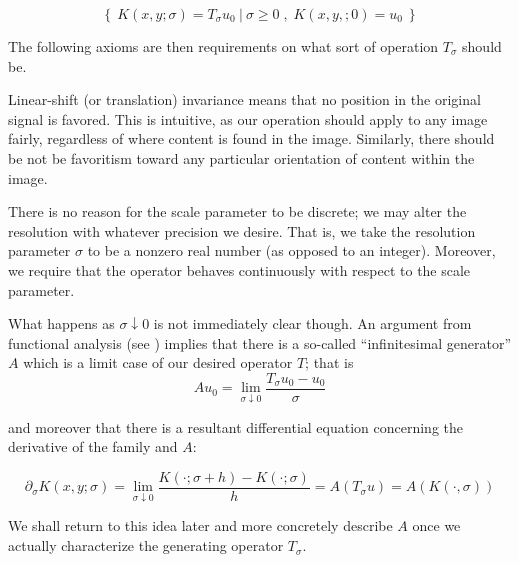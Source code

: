 	\[
		\left\{\ K(x,y;\sigma) = T_\sigma u_0
		\ \lvert \ 
		\sigma \ge 0
		\; ,\; K(x,y,;0) = u_0
		\ \right\} 
	\]
    
	The following axioms are then requirements on what sort
	of operation $T_\sigma$ should be.
		
    \begin{axiom}
    	\label{axiom:linear-shift-and-rotation}
    Linear-shift (or translation) invariance means that no position in the original signal is favored.  This is intuitive, as our operation should apply to any image fairly, regardless of where content is found in the image. Similarly, there should be not be favoritism toward any particular orientation of content within the image.
\end{axiom}
    
    \begin{axiom}
    	\label{axiom:continuity} There is no reason for the scale parameter to be discrete; we may alter the resolution with whatever
    precision we desire. That is, we take the resolution
    parameter $\sigma$ to be a nonzero real number
    (as opposed to an integer). Moreover, we require that the operator behaves continuously with respect to the scale parameter.
        \end{axiom}
    What happens as $\sigma \downarrow 0$ is not immediately clear though. 	An argument from functional analysis (see \cite{hille1957functional}) implies that there is a so-called ``infinitesimal generator'' $A$
	which is a limit case of our desired operator $T$; that is
	\begin{equation} \label{eq:infinitesimal-generator}
	A u_0 = \lim_{\sigma \downarrow 0} \frac{T_\sigma u_0 - u_0}{\sigma}
	\end{equation}
	 
	 and moreover that there is a resultant differential equation
	 concerning the derivative of the family and $A$:
	 
	 \begin{equation}
	 \partial_{\sigma} K(x,y;\sigma)
	 = \lim_{\sigma \downarrow 0}
	 \frac{K(\cdot;\sigma+h) - K(\cdot; \sigma)}{h}
	 = A(T_\sigma u) = A(K(\cdot,\sigma))
	 \end{equation}
	 
	 We shall return to this idea later and more concretely describe $A$ once we actually characterize the generating 
	 operator $T_\sigma$.
    
